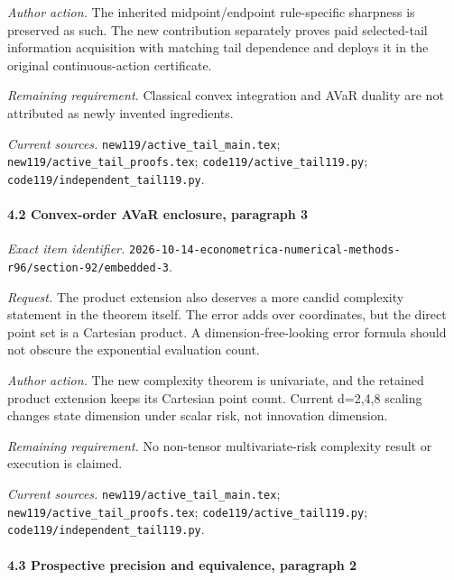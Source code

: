 \par\emph{Author action.} The inherited midpoint/\allowbreak{}endpoint rule-specific sharpness is preserved as such. The new contribution separately proves paid selected-tail information acquisition with matching tail dependence and deploys it in the original continuous-action certificate.

\par\emph{Remaining requirement.} Classical convex integration and AVaR duality are not attributed as newly invented ingredients.

\par\emph{Current sources.} \nolinkurl{new119/active_tail_main.tex}; \nolinkurl{new119/active_tail_proofs.tex}; \nolinkurl{code119/active_tail119.py}; \nolinkurl{code119/independent_tail119.py}.

\paragraph{4.2 Convex-order AVaR enclosure, paragraph 3}

\emph{Exact item identifier.} \nolinkurl{2026-10-14-econometrica-numerical-methods-r96/section-92/embedded-3}.

\par\emph{Request.} The product extension also deserves a more candid complexity statement in the theorem itself. The error adds over coordinates, but the direct point set is a Cartesian product. A dimension-free-looking error formula should not obscure the exponential evaluation count.

\par\emph{Author action.} The new complexity theorem is univariate, and the retained product extension keeps its Cartesian point count. Current d=2,4,8 scaling changes state dimension under scalar risk, not innovation dimension.

\par\emph{Remaining requirement.} No non-tensor multivariate-risk complexity result or execution is claimed.

\par\emph{Current sources.} \nolinkurl{new119/active_tail_main.tex}; \nolinkurl{new119/active_tail_proofs.tex}; \nolinkurl{code119/active_tail119.py}; \nolinkurl{code119/independent_tail119.py}.

\paragraph{4.3 Prospective precision and equivalence, paragraph 2}


